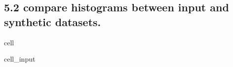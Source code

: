 \documentclass[letterpaper,10pt,english]{jupyterBook}
\begin{document}
\subsection{5.2 compare histograms between input and synthetic datasets.}
\label{\detokenize{src/test/SynthNAV0:compare-histograms-between-input-and-synthetic-datasets}}
\begin{sphinxuseclass}{cell}\begin{sphinxVerbatimInput}

\begin{sphinxuseclass}{cell_input}
\begin{sphinxVerbatim}[commandchars=\\\{\}]
   
\end{sphinxVerbatim}

\end{sphinxuseclass}\end{sphinxVerbatimInput}
\begin{sphinxVerbatimOutput}


\end{sphinxVerbatimOutput}
\end{sphinxuseclass}
\end{document}
